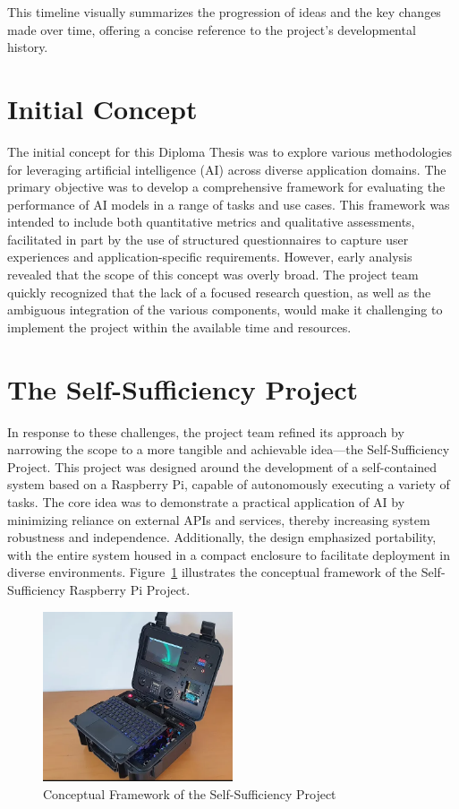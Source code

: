This timeline visually summarizes the progression of ideas and the key changes made over time, offering a concise reference to the project's developmental history.


\section{Initial Concept}

The initial concept for this Diploma Thesis was to explore various methodologies for leveraging artificial intelligence (AI) across diverse application domains. The primary objective was to develop a comprehensive framework for evaluating the performance of AI models in a range of tasks and use cases. This framework was intended to include both quantitative metrics and qualitative assessments, facilitated in part by the use of structured questionnaires to capture user experiences and application-specific requirements. However, early analysis revealed that the scope of this concept was overly broad. The project team quickly recognized that the lack of a focused research question, as well as the ambiguous integration of the various components, would make it challenging to implement the project within the available time and resources.

\section{The Self-Sufficiency Project}

In response to these challenges, the project team refined its approach by narrowing the scope to a more tangible and achievable idea—the Self-Sufficiency Project. This project was designed around the development of a self-contained system based on a Raspberry Pi, capable of autonomously executing a variety of tasks. The core idea was to demonstrate a practical application of AI by minimizing reliance on external APIs and services, thereby increasing system robustness and independence. Additionally, the design emphasized portability, with the entire system housed in a compact enclosure to facilitate deployment in diverse environments. Figure~\ref{fig:SelfSufficiencyProject} illustrates the conceptual framework of the Self-Sufficiency Raspberry Pi Project.

\begin{figure}[H]
    \centering
    \includegraphics[width=0.5\textwidth]{figures/SAIPIA-concept-picture.png}
    \caption{Conceptual Framework of the Self-Sufficiency Project}
    \label{fig:SelfSufficiencyProject}
\end{figure}

